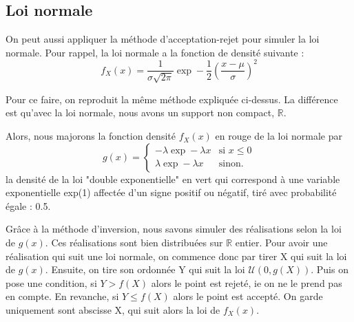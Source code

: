 \documentclass[10pt]{article} %
\begin{document}
\subsection{Loi normale}

On peut aussi appliquer la méthode d'acceptation-rejet pour simuler la loi normale. Pour rappel, la loi normale a la fonction de densité suivante :
$$f_X(x) = \frac{1}{\sigma \sqrt{2\pi}}\exp-\frac{1}{2}(\frac {x-\mu}{\sigma})^2$$

Pour ce faire, on reproduit la même méthode expliquée ci-dessus. La différence est qu'avec la loi normale, nous avons un support non compact, $  \mathbb{R} $.

Alors, nous majorons la fonction densité $f_X(x)$ en rouge de la loi normale par 
$$g(x) = \left\{
    \begin{array}{ll}
        -\lambda\exp-\lambda x & \mbox{si } x \le 0 \\
        \lambda\exp-\lambda x & \mbox{sinon.}
    \end{array}
\right. $$
la densité de la loi "double exponentielle" en vert qui correspond à une variable exponentielle exp(1) affectée d'un signe positif ou négatif, tiré avec probabilité égale : 0.5.


Grâce à la méthode d'inversion, nous savons simuler des réalisations selon la loi de $g(x)$. Ces réalisations sont bien distribuées sur $  \mathbb{R} $ entier. Pour avoir une réalisation qui suit une loi normale, on commence donc par tirer X qui suit la loi de $g(x)$. Ensuite, on tire son ordonnée Y qui suit la loi $\mathcal{U}(0, g(X))$. Puis on pose une condition, si $Y > f(X)$ alors le point est rejeté, ie on ne le prend pas en compte. En revanche, si $Y \le f(X)$ alors le point est accepté. On garde uniquement sont abscisse X, qui suit alors la loi de $f_X(x)$.

\newpage
\end{document}
